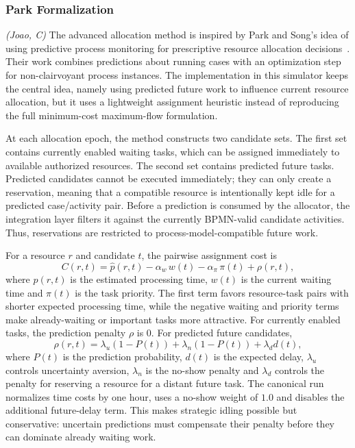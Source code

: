 \subsubsection{Park Formalization}\label{ssub:park}
\textit{(Joao, C)}\quad
The advanced allocation method is inspired by Park and Song's idea of using
predictive process monitoring for prescriptive resource allocation
decisions~\cite{park2023predictiveallocation}. Their work combines predictions
about running cases with an optimization step for non-clairvoyant process
instances. The implementation in this simulator keeps the central idea, namely
using predicted future work to influence current resource allocation, but it uses
a lightweight assignment heuristic instead of reproducing the full minimum-cost
maximum-flow formulation.

At each allocation epoch, the method constructs two candidate sets. The first set
contains currently enabled waiting tasks, which can be assigned immediately to
available authorized resources. The second set contains predicted future tasks.
Predicted candidates cannot be executed immediately; they can only create a
reservation, meaning that a compatible resource is intentionally kept idle for a
predicted case/activity pair. Before a prediction is consumed by the allocator,
the integration layer filters it against the currently BPMN-valid candidate
activities. Thus, reservations are restricted to process-model-compatible future
work.

For a resource $r$ and candidate $t$, the pairwise assignment cost is
\[
C(r,t) = \hat{p}(r,t) - \alpha_w\,w(t) - \alpha_\pi\,\pi(t) + \rho(r,t),
\]
where $\hat{p}(r,t)$ is the estimated processing time, $w(t)$ is the current
waiting time and $\pi(t)$ is the task priority. The first term favors
resource-task pairs with shorter expected processing time, while the negative
waiting and priority terms make already-waiting or important tasks more
attractive. For currently enabled tasks, the prediction penalty $\rho$ is $0$.
For predicted future candidates,
\[
\rho(r,t) = \lambda_u(1-P(t)) + \lambda_n(1-P(t)) + \lambda_d d(t),
\]
where $P(t)$ is the prediction probability, $d(t)$ is the expected delay,
$\lambda_u$ controls uncertainty aversion, $\lambda_n$ is the no-show penalty and
$\lambda_d$ controls the penalty for reserving a resource for a distant future
task. The canonical run normalizes time costs by one hour, uses a no-show weight
of $1.0$ and disables the additional future-delay term. This makes strategic
idling possible but conservative: uncertain predictions must compensate their
penalty before they can dominate already waiting work.

